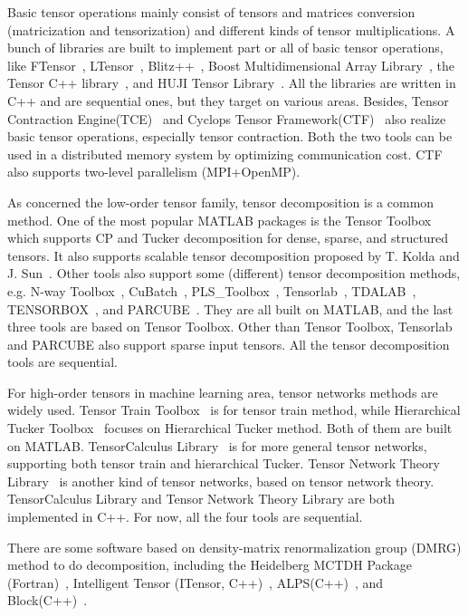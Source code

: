 \documentclass[10pt]{article}
\begin{document}
Basic tensor operations mainly consist of tensors and matrices conversion (matricization and tensorization) and different kinds of tensor multiplications. A bunch of libraries are built to implement part or all of basic tensor operations, like FTensor~\cite{Landry:2003:IHP:1240120.1240122,FTensor}, LTensor~\cite{LTensor}, Blitz++~\cite{blitz}, Boost Multidimensional Array Library~\cite{boost-multiarray}, the Tensor C++ library~\cite{tensorCPP}, and HUJI Tensor Library~\cite{huji}. All the libraries are written in C++ and are sequential ones, but they target on various areas. Besides, Tensor Contraction Engine(TCE)~\cite{TCE} and Cyclops Tensor Framework(CTF)~\cite{CTF} also realize basic tensor operations, especially tensor contraction. Both the two tools can be used in a distributed memory system by optimizing communication cost. CTF also supports two-level parallelism (MPI+OpenMP).

As concerned the low-order tensor family, tensor decomposition is a common method. 
One of the most popular MATLAB packages is the
Tensor Toolbox~\cite{TensorToolbox} which supports CP and Tucker decomposition for dense, sparse, and structured tensors. It also supports scalable tensor decomposition proposed by T. Kolda and J. Sun~\cite{Kolda:2008:STD:1510528.1511376}. Other tools also support some (different) tensor decomposition methods, e.g. N-way Toolbox~\cite{Nway-Paper,Nway}, CuBatch~\cite{CuBatch}, PLS\_Toolbox~\cite{PLS-toolbox}, Tensorlab~\cite{Tensorlab}, TDALAB~\cite{TDALAB,TDALAB_online}, TENSORBOX~\cite{TENSORBOX}, and PARCUBE~\cite{PARCUBE}. They are all built on MATLAB, and the last three tools are based on Tensor Toolbox. Other than Tensor Toolbox, Tensorlab and PARCUBE also support sparse input tensors. All the tensor decomposition tools are sequential.

For high-order tensors in machine learning area, tensor networks methods are widely used. Tensor Train Toolbox~\cite{tt-toolbox} is for tensor train method, while Hierarchical Tucker Toolbox~\cite{HT,Kressner:2014:A9H:2610268.2538688} focuses on Hierarchical Tucker method. Both of them are built on MATLAB. TensorCalculus Library~\cite{Calculus} is for more general tensor networks, supporting both tensor train and hierarchical Tucker. Tensor Network Theory Library~\cite{TNT} is another kind of tensor networks, based on tensor network theory. TensorCalculus Library and Tensor Network Theory Library are both implemented in C++. For now, all the four tools are sequential. 

There are some software based on density-matrix renormalization group (DMRG) method to do decomposition, including the Heidelberg MCTDH Package (Fortran)~\cite{MCTDH}, Intelligent Tensor (ITensor, C++)~\cite{ITensor}, ALPS(C++)~\cite{ALPS}, and Block(C++)~\cite{Block}. 
\end{document}
